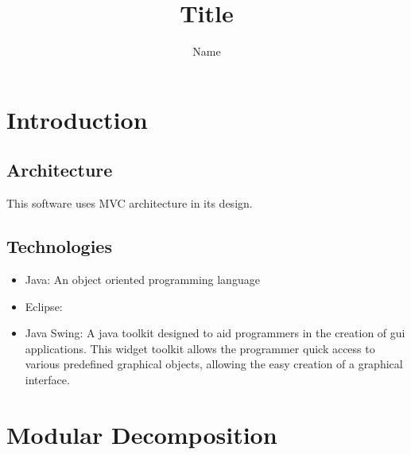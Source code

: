 \documentclass[12pt]{article}
\begin{document}
		\title{Title} %
		\author{Name} %
		
		\maketitle
		\thispagestyle{empty}
		\newpage
		
		\section{Introduction}
		
		\subsection{Architecture}
		\begin{figure}[!h]
			\centering
		\end{figure}
		This software uses MVC architecture in its design. 
		\subsection{Technologies}
		\begin{itemize}
		\item Java:  An object oriented programming language 
		\item Eclipse: 
		\item Java Swing: A java toolkit designed to aid programmers in the creation of gui applications. This widget toolkit allows the programmer quick access to various predefined graphical objects, allowing the easy creation of a graphical interface.
		
		\end{itemize}
		\section{Modular Decomposition}
\end{document}
